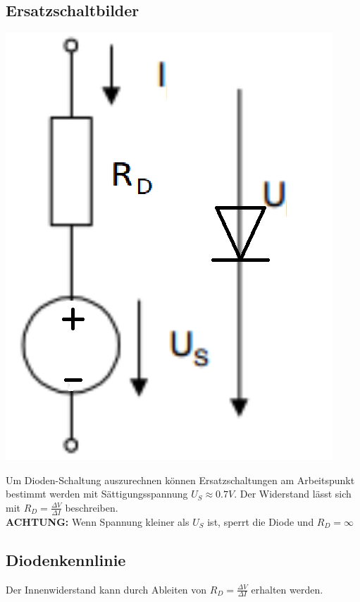 \subsection{Ersatzschaltbilder}
\begin{minipage}{0.20\textwidth}
	\includegraphics[width=\linewidth,keepaspectratio=true]{./Images/diode_esb}
\end{minipage}%
\begin{minipage}{0.30\textwidth}
	Um Dioden-Schaltung auszurechnen können Ersatzschaltungen am Arbeitspunkt bestimmt werden mit Sättigungsspannung $U_S \approx 0.7V$. Der Widerstand lässt sich mit $R_D = \frac{\Delta V}{\Delta I}$ beschreiben. \\
	\textbf{ACHTUNG:} Wenn Spannung kleiner als $U_S$ ist, sperrt die Diode und $R_D = \infty$
\end{minipage}

\subsection{Diodenkennlinie}
Der Innenwiderstand kann durch Ableiten von $R_D = \frac{\Delta V}{\Delta I}$ erhalten werden.\\


